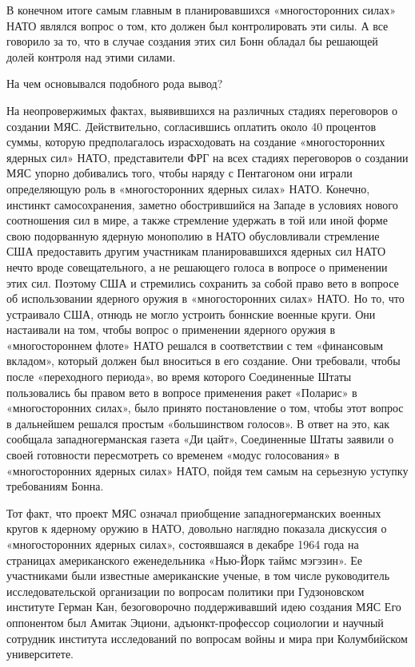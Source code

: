 \documentclass[12pt, a4paper, openany]{book}
\begin{document}
	В конечном итоге самым главным в планировавшихся «многосторонних силах» НАТО являлся вопрос о том, кто должен был контролировать эти силы. А все говорило за то, что в случае создания этих сил Бонн обладал бы решающей долей контроля над этими силами.
	
	На чем основывался подобного рода вывод?
	
	На неопровержимых фактах, выявившихся на различных стадиях переговоров о создании МЯС. Действительно, согласившись оплатить около 40 процентов суммы, которую предполагалось израсходовать на создание «многосторонних ядерных сил» НАТО, представители ФРГ на всех стадиях переговоров о создании МЯС упорно добивались того, чтобы наряду с Пентагоном они играли определяющую роль в «многосторонних ядерных силах» НАТО. Конечно, инстинкт самосохранения, заметно обострившийся на Западе в условиях нового соотношения сил в мире, а также стремление удержать в той или иной форме свою подорванную ядерную монополию в НАТО обусловливали стремление США предоставить другим участникам планировавшихся ядерных сил НАТО нечто вроде совещательного, а не решающего голоса в вопросе о применении этих сил. Поэтому США и стремились сохранить за собой право вето в вопросе об использовании ядерного оружия в «многосторонних силах» НАТО. Но то, что устраивало США, отнюдь не могло устроить боннские военные круги. Они настаивали на том, чтобы вопрос о применении ядерного оружия в «многостороннем флоте» НАТО решался в соответствии с тем «финансовым вкладом», который должен был вноситься в его создание. Они требовали, чтобы после «переходного периода», во время которого Соединенные Штаты пользовались бы правом вето в вопросе применения ракет «Поларис» в «многосторонних силах», было принято постановление о том, чтобы этот вопрос в дальнейшем решался простым «большинством голосов». В ответ на это, как сообщала западногерманская газета «Ди цайт», Соединенные Штаты заявили о своей готовности пересмотреть со временем «модус голосования» в «многосторонних ядерных силах» НАТО, пойдя тем самым на серьезную уступку требованиям Бонна.
	
	Тот факт, что проект МЯС означал приобщение западногерманских военных кругов к ядерному оружию в НАТО, довольно наглядно показала дискуссия о «многосторонних ядерных силах», состоявшаяся в декабре 1964 года на страницах американского еженедельника «Нью-Йорк таймс мэгэзин». Ее участниками были известные американские ученые, в том числе руководитель исследовательской организации по вопросам политики при Гудзоновском институте Герман Кан, безоговорочно поддерживавший идею создания МЯС Его оппонентом был Амитак Эциони, адъюнкт-профессор социологии и научный сотрудник института исследований по вопросам войны и мира при Колумбийском университете.
	
\end{document}
